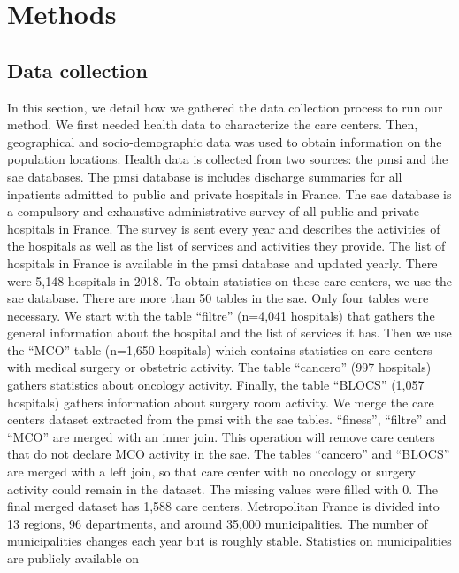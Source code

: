 \section{Methods}

\subsection{Data collection}

In this section, we detail how we gathered the data collection process to run
our method.  We first needed health data to characterize the care centers. Then,
geographical and socio-demographic data was used to obtain information on the
population locations. Health data is collected from two sources: the \ac{pmsi}
and the \ac{sae} databases. The \ac{pmsi} database is includes discharge
summaries for all inpatients admitted to public and private hospitals in France.
The \ac{sae} database is a compulsory and exhaustive administrative survey of
all public and private hospitals in France. The survey is sent every year and
describes the activities of the hospitals as well as the list of services and
activities they provide. The list of hospitals in France is available in the
\ac{pmsi} database and updated yearly. There were 5,148 hospitals in 2018. To
obtain statistics on these care centers, we use the \ac{sae} database. There are
more than 50 tables in the \ac{sae}. Only four tables were necessary. We start
with the table ``filtre'' (n=4,041 hospitals) that gathers the general
information about the hospital and the list of services it has. Then we use the
``MCO'' table (n=1,650 hospitals) which contains statistics on care centers with
medical surgery or obstetric activity. The table ``cancero'' (997 hospitals)
gathers statistics about oncology activity. Finally, the table ``BLOCS'' (1,057
hospitals) gathers information about surgery room activity. We merge the care
centers dataset extracted from the \ac{pmsi} with the \ac{sae} tables.
``finess'', ``filtre'' and ``MCO'' are merged with an inner join. This operation
will remove care centers that do not declare MCO activity in the \ac{sae}. The
tables ``cancero'' and ``BLOCS'' are merged with a left join, so that care
center with no oncology or surgery activity could remain in the dataset. The
missing values were filled with 0. The final merged dataset has 1,588 care
centers. Metropolitan France is divided into 13 regions, 96 departments, and
around 35,000 municipalities. The number of municipalities changes each year but
is roughly stable. Statistics on municipalities are publicly available on
